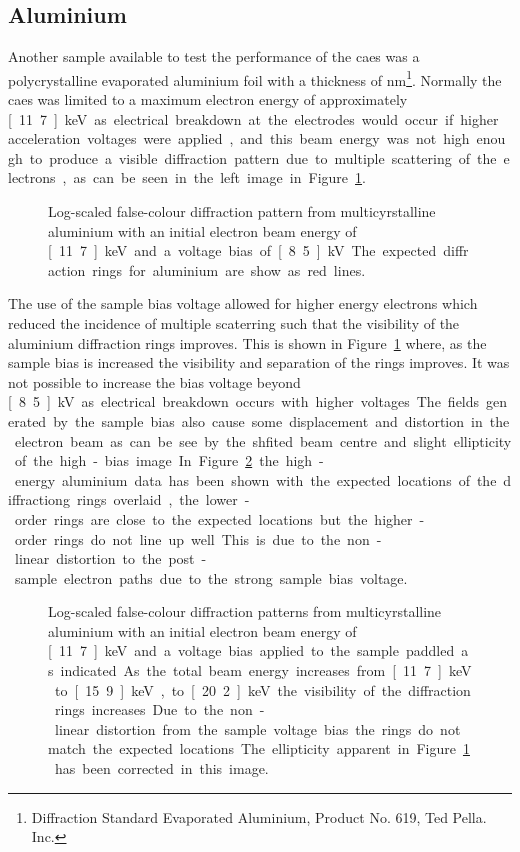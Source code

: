 \subsection{Aluminium}\label{section:aluminium_diffraction}

Another sample available to test the performance of the \gls{caes} was a polycrystalline evaporated aluminium foil with a thickness of \unit[31]{nm}\footnote{Diffraction Standard Evaporated Aluminium, Product No. 619, Ted Pella. Inc.}.
Normally the \gls{caes} was limited to a maximum electron energy of approximately \unit[11.7]{keV} as electrical breakdown at the electrodes would occur if higher acceleration voltages were applied, and this beam energy was not high enough to produce a visible diffraction pattern due to multiple scattering of the electrons, as can be seen in the left image in Figure~\ref{figure:al_diffraction}.

\begin{figure}
    \center
    
    \caption{Log-scaled false-colour diffraction pattern from multicyrstalline aluminium with an initial electron beam energy of \unit[11.7]{keV} and a voltage bias of \unit[8.5]{kV}. The expected diffraction rings for aluminium are show as red lines.}
    \label{figure:al_diffraction}
\end{figure}

The use of the sample bias voltage allowed for higher energy electrons which reduced the incidence of multiple scaterring such that the visibility of the aluminium diffraction rings improves.
This is shown in Figure~\ref{figure:al_diffraction} where, as the sample bias is increased the visibility and separation of the rings improves.
It was not possible to increase the bias voltage beyond \unit[8.5]{kV} as electrical breakdown occurs with higher voltages.
The fields generated by the sample bias also cause some displacement and distortion in the electron beam as can be see by the shfited beam centre and slight ellipticity of the high-bias image.

In Figure~\ref{figure:al_diffraction_rings} the high-energy aluminium data has been shown with the expected locations of the diffractiong rings overlaid, the lower-order rings are close to the expected locations but the higher-order rings do not line up well.
This is due to the non-linear distortion to the post-sample electron paths due to the strong sample bias voltage.

\begin{figure}
    \center
    
    \caption{Log-scaled false-colour diffraction patterns from multicyrstalline aluminium with an initial electron beam energy of \unit[11.7]{keV} and a voltage bias applied to the sample paddled as indicated. As the total beam energy increases from \unit[11.7]{keV} to \unit[15.9]{keV}, to \unit[20.2]{keV} the visibility of the diffraction rings increases. Due to the non-linear distortion from the sample voltage bias the rings do not match the expected locations. The ellipticity apparent in Figure~\ref{figure:al_diffraction} has been corrected in this image.}
    \label{figure:al_diffraction_rings}
\end{figure}


